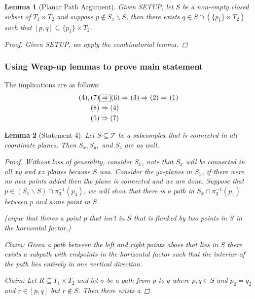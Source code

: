 \documentclass{article}
\theoremstyle{mystyle}
\newtheorem{lem}{Lemma}[section]
\theoremstyle{remark}
\begin{document}
\begin{lem}
    [Planar Path Argument]
    Given SETUP, let \(S\) be a non-empty closed subset of \(T_{1} \times T_{2}\) and suppose \(p \not\in S_{x}\smallsetminus S\), then there exists \(q \in S \cap \left( \{p_{1} \} \times T_{2} \right)\) such that \([p,q] \subseteq \{p_{1} \} \times T_{2}\).
    \begin{proof}
        Given SETUP, we apply the combinatorial lemma.
    \end{proof}
\end{lem}

\subsubsection{Using Wrap-up lemmas to prove main statement}
The implications are as follows:
\begin{alignat}{3}
    (4),(7) &\fbox{\(\Rightarrow\)}  (6) \Rightarrow (3) \Rightarrow (2)\Rightarrow (1)\\
    (8) &\Rightarrow (4)\\
    (5) &\Rightarrow (7)
\end{alignat}

\begin{lem}
    [Statement 4]
    Let \(S \subseteq \mathscr{T}\) be a subcomplex that is connected in all coordinate planes. Then \(S_{x}, S_{y},\) and \(S_{z}\) are as well. 
    \begin{proof}
        Without loss of generality, consider \(S_{ x}\), note that \(S_{x}\) will be connected in all \(xy\) and \(xz\) planes because \(S\) was. Consider the \(yz\)-planes in \(S_{x}\), if there were no new points added then the plane is connected and we are done. Suppose that \( p \in (S_{x} \smallsetminus S ) \cap \pi^{-1} _{3} (p_{3} )\), we will show that there is a path in \(S_{x} \cap \pi_{3}^{-1} (p_{1} )\) between \(p\) and some point in \(S\).
       
        (argue that theres a point \(p\) that isn't in \(S\) that is flanked by two points in \(S\) in the horizontal factor.)
        
        {\sc Claim:} Given a path between the left and right points above that lies in \(S\) there exists a subpath with endpoints in the horizontal factor such that the interior of the path lies entirely in {\em one vertical direction}.

            {\sc Claim:} Let \(R \subseteq T_{1} \times T_{2}\) and let \(\sigma\) be a path from \(p\) to \(q\) where \(p,q \in S\) and \(p_{2} = q_{2}\) and \(r \in [p,q]\) but \(r \not\in S\). Then there exists a 
    \end{proof}
\end{lem}
\end{document}
